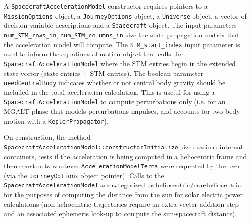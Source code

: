 A \texttt{SpacecraftAccelerationModel} constructor requires pointers to a \texttt{MissionOptions} object, a \texttt{JourneyOptions} object, a \texttt{Universe} object, a vector of decision variable descriptions and a \texttt{Spacecraft} object. The input parameters \texttt{num\_STM\_rows\_in}, \texttt{num\_STM\_columns\_in} size the state propagation matrix that the acceleration model will compute. The \texttt{STM\_start\_index} input parameter is used to inform the equations of motion object that calls the \texttt{SpacecraftAccelerationModel} where the STM entries begin in the extended state vector (state entries + STM entries). The boolean parameter \texttt{needCentralBody} indicates whether or not central body gravity should be included in the total acceleration calculation. This is useful for using a \texttt{SpacecraftAccelerationModel} to compute perturbations only (i.e. for an MGALT phase that models perturbations impulses, and accounts for two-body motion with a \texttt{KeplerPropagator}).

On construction, the method \texttt{SpacecraftAccelerationModel::constructorInitialize} sizes various internal containers, tests if the acceleration is being computed in a heliocentric frame and then constructs whatever \texttt{AccelerationModelTerms} were requested by the user (via the \texttt{JourneyOptions} object pointer). Calls to the \texttt{SpacecraftAccelerationModel} are categorized as heliocentric/non-heliocentric for the purposes of computing the distance from the sun for solar electric power calculations (non-heliocentric trajectories require an extra vector addition step and an associated ephemeris look-up to compute the sun-spacecraft distance).

